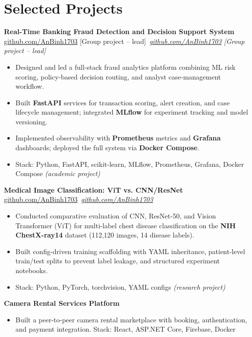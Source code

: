 \documentclass[10.5pt,a4paper]{article}
\newcommand{\projrow}[2]{%
  \vspace{2pt}%
  {\bfseries #1}%
  \ifx#2\empty\else\ \hfill \textcolor{muted}{\small\itshape #2}\fi%
  \vspace{1pt}%
}
\begin{document}
\section{Selected Projects}

\projrow{Real-Time Banking Fraud Detection and Decision Support System}{\href{https://github.com/AnBinh1703/Banking_Transaction_Fraud_Detection_Decision_Support_System}{github.com/AnBinh1703} [Group project -- lead]}
\begin{itemize}
  \item Designed and led a full-stack fraud analytics platform combining ML risk scoring, policy-based decision routing, and analyst case-management workflow.
  \item Built \textbf{FastAPI} services for transaction scoring, alert creation, and case lifecycle management; integrated \textbf{MLflow} for experiment tracking and model versioning.
  \item Implemented observability with \textbf{Prometheus} metrics and \textbf{Grafana} dashboards; deployed the full system via \textbf{Docker Compose}.
  \item Stack: Python, FastAPI, scikit-learn, MLflow, Prometheus, Grafana, Docker Compose \textit{(academic project)}
\end{itemize}

\projrow{Medical Image Classification: ViT vs. CNN/ResNet}{\href{https://github.com/AnBinh1703/ViT-Chest-Xray}{github.com/AnBinh1703}}
\begin{itemize}
  \item Conducted comparative evaluation of CNN, ResNet-50, and Vision Transformer (ViT) for multi-label chest disease classification on the \textbf{NIH ChestX-ray14} dataset (112,120 images, 14 disease labels).
  \item Built config-driven training scaffolding with YAML inheritance, patient-level train/test splits to prevent label leakage, and structured experiment notebooks.
  \item Stack: Python, PyTorch, torchvision, YAML configs \textit{(research project)}
\end{itemize}

\projrow{Camera Rental Services Platform}{}
\begin{itemize}
  \item Built a peer-to-peer camera rental marketplace with booking, authentication, and payment integration.
  Stack: React, ASP.NET Core, Firebase, Docker
\end{itemize}
\end{document}
